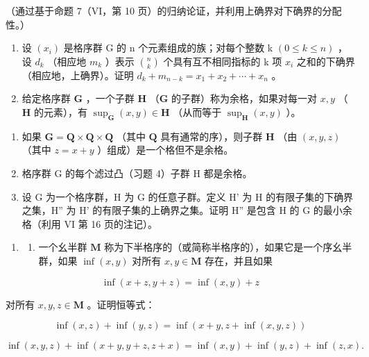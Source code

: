 （通过基于命题 7（VI，第 10 页）的归纳论证，并利用上确界对下确界的分配性。）

\begin{enumerate}
\def\labelenumi{\arabic{enumi})}
\setcounter{enumi}{10}
\item
  设 \((x_{i})\) 是格序群 G 的 n 个元素组成的族；对每个整数 k \((0 \leqslant k \leqslant n)\) ，设 \(d_{k}\) （相应地 \(m_{k}\) ）表示 \(\binom{n}{k}\) 个具有互不相同指标的 k 项 \(x_{i}\) 之和的下确界（相应地，上确界）。证明 \(d_{k} + m_{n-k} = x_{1} + x_{2} + \cdots + x_{n}\) 。
\item
  给定格序群 \(\mathbf{G}\) ，一个子群 \(\mathbf{H}\) （\(\mathbf{G}\) 的子群）称为余格，如果对每一对 \(x, y\) （\(\mathbf{H}\) 的元素），有 \(\sup_{\mathbf{G}}(x, y) \in \mathbf{H}\) （从而等于 \(\sup_{\mathbf{H}}(x, y)\) ）。
\end{enumerate}

\begin{enumerate}
\def\labelenumi{\alph{enumi})}
\item
  如果 \(\mathbf{G} = \mathbf{Q} \times \mathbf{Q} \times \mathbf{Q}\) （其中 \(\mathbf{Q}\) 具有通常的序），则子群 \(\mathbf{H}\) （由 \((x, y, z)\) （其中 \(z = x + y\) ）组成）是一个格但不是余格。
\item
  格序群 G 的每个滤过凸（习题 4）子群 H 都是余格。
\item
  设 G 为一个格序群，H 为 G 的任意子群。定义 H' 为 H 的有限子集的下确界之集，H'' 为 H' 的有限子集的上确界之集。证明 H'' 是包含 H 的 G 的最小余格（利用 VI 第 16 页的注记）。
\end{enumerate}

\begin{enumerate}
\def\labelenumi{\arabic{enumi})}
\setcounter{enumi}{12}
\tightlist
\item
  \begin{enumerate}
  \def\labelenumii{\alph{enumii})}
  \tightlist
  \item
    一个幺半群 \(\mathbf{M}\) 称为下半格序的（或简称半格序的），如果它是一个序幺半群，如果 \(\inf(x, y)\) 对所有 \(x, y \in \mathbf{M}\) 存在，并且如果
  \end{enumerate}
\end{enumerate}

\[
\inf (x + z, y + z) = \inf (x, y) + z
\]

对所有 \(x, y, z \in \mathbf{M}\) 。证明恒等式：

\[
\inf (x, z) + \inf (y, z) = \inf (x + y, z + \inf (x, y, z))
\]

\[
\inf (x, y, z) + \inf (x + y, y + z, z + x) = \inf (x, y) + \inf (y, z) + \inf (z, x).
\]

